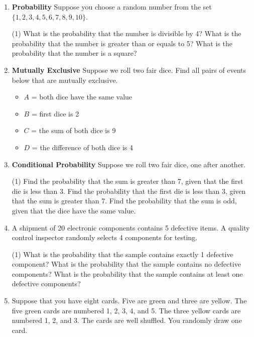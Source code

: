 \begin{enumerate}

\item \textbf{Probability} Suppose you choose a random number from the set $\{1,2,3,4,5,6,7,8,9,10\}$.
\begin{tasks}[after-skip = 80pt, after-item-skip=50pt](1)
\task What is the probability that the number is divisible by 4?
\task  What is the probability that the number is greater than or equals to 5?
\task What is the probability that the number is a square?
\end{tasks}

\item \textbf{Mutually Exclusive} Suppose we roll two fair dice. Find all pairs of events below that are mutually exclusive.
\begin{itemize}
\item $A$ = both dice have the same value
\item $B$ = first dice is 2
\item $C$ = the sum of both dice is 9
\item $D$ = the difference of both dice is 4
\end{itemize}
\vspace{50pt}

\item \textbf{Conditional Probability} Suppose we roll two fair dice, one after another.
\begin{tasks}[after-skip = 80pt, after-item-skip=60pt](1)
\task Find the probability that the sum is greater than 7, given that the first die is less than 3.
\task Find the probability that the first die is less than 3, given that the sum is greater than 7.
\task Find the probability that the sum is odd, given that the dice have the same value.
\end{tasks}

\newpage
\item A shipment of 20 electronic components contains 5 defective items. A quality control inspector randomly selects 4 components for testing. 
\begin{tasks}(1)
\task What is the probability that the sample contains exactly 1 defective component?
\task What is the probability that the sample contains no defective components?
\task What is the probability that the sample contains at least one defective components?
\end{tasks}
\vspace{120pt}

\item Suppose that you have eight cards. Five are green and three are yellow. The five green cards are numbered 1, 2, 3, 4, and 5. The three yellow cards are numbered 1, 2, and 3. The cards are well shuffled. You randomly draw one card.
\medskip


\end{enumerate}
